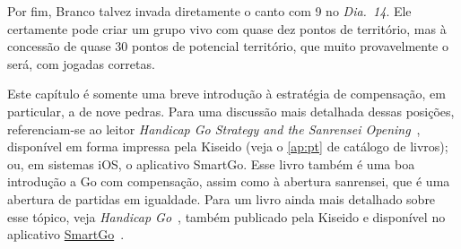 Por fim, Branco talvez invada diretamente o canto com 9 no \emph{Dia.\@~14}. Ele certamente pode criar um grupo vivo com quase dez pontos de território, mas à concessão de quase 30 pontos de potencial território, que muito provavelmente o será, com jogadas corretas.

\bigskip

Este capítulo é somente uma breve introdução à estratégia de compensação, em particular, a de nove pedras. Para uma discussão mais detalhada dessas posições, referenciam-se ao leitor \emph{Handicap Go Strategy and the Sanrensei Opening}~\cite{zeijst_bozulich_handicap_sanrensei}, disponível em forma impressa pela Kiseido (veja o \autoref{ap:pt} de catálogo de livros); ou, em sistemas iOS, o aplicativo SmartGo. Esse livro também é uma boa introdução a Go com compensação, assim como à abertura sanrensei, que é uma abertura de partidas em igualdade. Para um livro ainda mais detalhado sobre esse tópico, veja \emph{Handicap Go}~\cite{nagahara_bozulich_handicap_go}, também publicado pela Kiseido e disponível no aplicativo \href{apps.apple.com/us/app/smartgo-player/id314506629}{SmartGo}~\cite{smartgo}.